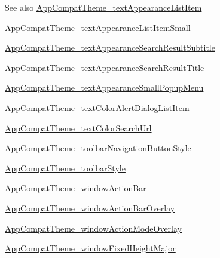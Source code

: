 \begin{DoxySeeAlso}{See also}
\hyperlink{classandroid_1_1support_1_1v7_1_1mediarouter_1_1R_1_1styleable_ae585f2ef6f2ff59cc4f7be52f5ce8f26}{App\+Compat\+Theme\+\_\+text\+Appearance\+List\+Item} 

\hyperlink{classandroid_1_1support_1_1v7_1_1mediarouter_1_1R_1_1styleable_abfe06fe93e65f2145a7481cd483217d0}{App\+Compat\+Theme\+\_\+text\+Appearance\+List\+Item\+Small} 

\hyperlink{classandroid_1_1support_1_1v7_1_1mediarouter_1_1R_1_1styleable_a505319de1733441b256077401041e226}{App\+Compat\+Theme\+\_\+text\+Appearance\+Search\+Result\+Subtitle} 

\hyperlink{classandroid_1_1support_1_1v7_1_1mediarouter_1_1R_1_1styleable_a145215c955a16a489e091f3192f05b55}{App\+Compat\+Theme\+\_\+text\+Appearance\+Search\+Result\+Title} 

\hyperlink{classandroid_1_1support_1_1v7_1_1mediarouter_1_1R_1_1styleable_aa0894f67d2b6095af2c79e757016f8ef}{App\+Compat\+Theme\+\_\+text\+Appearance\+Small\+Popup\+Menu} 

\hyperlink{classandroid_1_1support_1_1v7_1_1mediarouter_1_1R_1_1styleable_a02d892ae076bbe1feac3d55796e9bca8}{App\+Compat\+Theme\+\_\+text\+Color\+Alert\+Dialog\+List\+Item} 

\hyperlink{classandroid_1_1support_1_1v7_1_1mediarouter_1_1R_1_1styleable_a836d3802c62c78eac8fe21e652c6263b}{App\+Compat\+Theme\+\_\+text\+Color\+Search\+Url} 

\hyperlink{classandroid_1_1support_1_1v7_1_1mediarouter_1_1R_1_1styleable_a354b2153b08d409c7335a25b06bf98e2}{App\+Compat\+Theme\+\_\+toolbar\+Navigation\+Button\+Style} 

\hyperlink{classandroid_1_1support_1_1v7_1_1mediarouter_1_1R_1_1styleable_ad3fea9f4d259e9e79e8d8f944d3f692b}{App\+Compat\+Theme\+\_\+toolbar\+Style} 

\hyperlink{classandroid_1_1support_1_1v7_1_1mediarouter_1_1R_1_1styleable_ad5254bfaca20d46ec980af0056e2a282}{App\+Compat\+Theme\+\_\+window\+Action\+Bar} 

\hyperlink{classandroid_1_1support_1_1v7_1_1mediarouter_1_1R_1_1styleable_a3ed10a138c0c8928988e19b890aec7f7}{App\+Compat\+Theme\+\_\+window\+Action\+Bar\+Overlay} 

\hyperlink{classandroid_1_1support_1_1v7_1_1mediarouter_1_1R_1_1styleable_ae55a9de1cb75512d04d62f878dcfefc3}{App\+Compat\+Theme\+\_\+window\+Action\+Mode\+Overlay} 

\hyperlink{classandroid_1_1support_1_1v7_1_1mediarouter_1_1R_1_1styleable_a7f07a96e9dd77caa12d1744db19f037d}{App\+Compat\+Theme\+\_\+window\+Fixed\+Height\+Major} 


\end{DoxySeeAlso}
